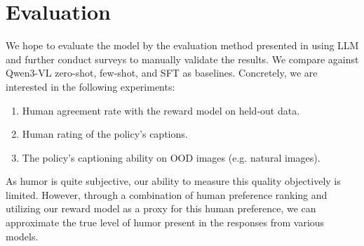\documentclass{article}
\begin{document}

\vspace{-0.5em}
\section{Evaluation}
\vspace{-0.5em}
We hope to evaluate the model by the evaluation method presented in \cite{zhang2024humoraimassivescale} using LLM and further conduct surveys to manually validate the results. We compare against Qwen3-VL zero-shot, few-shot, and SFT as baselines. Concretely, we are interested in the following experiments:
\begin{enumerate}
    \item Human agreement rate with the reward model on held-out data.
    \item Human rating of the policy's captions.
    \item The policy's captioning ability on OOD images (e.g. natural images).
\end{enumerate}
As humor is quite subjective, our ability to measure this quality objectively is limited. However, through a combination of human preference ranking and utilizing our reward model as a proxy for this human preference, we can approximate the true level of humor present in the responses from various models.



\end{document}
